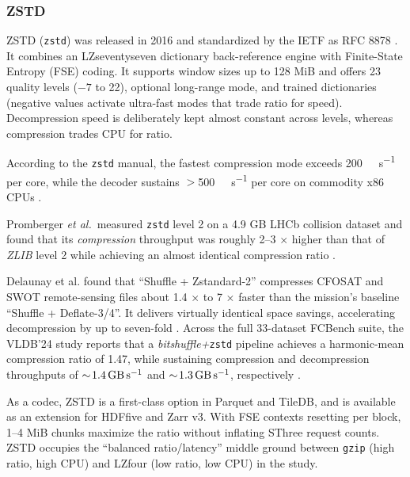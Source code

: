 \documentclass[nomenclature, english, bibtex]{kththesis}
\numberwithin{listing}{chapter}
\begin{document}
\subsubsection{\texorpdfstring{\gls{ZSTD}}{zstd}}
\label{sec:compression-zstd}
\gls{ZSTD} (\texttt{zstd}) was released in 2016 and standardized by the IETF as \gls{RFC} 8878 \cite{collet2021rfc8878}. It combines an \gls{LZseventyseven} dictionary back-reference engine with Finite-State Entropy (\gls{FSE}) coding. It supports window sizes up to 128 MiB and offers 23 quality levels ($-7$ to 22), optional long-range mode, and trained dictionaries (negative values activate ultra-fast modes that trade ratio for speed). Decompression speed is deliberately kept almost constant across levels, whereas compression trades \gls{CPU} for ratio.

According to the \texttt{zstd} manual, the fastest compression mode exceeds \SI{200}{\mega\byte\per\second} per core, while the decoder sustains $>$\SI{500}{\mega\byte\per\second} per core on commodity x86 \gls{CPU}s \cite{zstdman2025}.

Promberger \emph{et al.}\ measured \texttt{zstd} level 2 on a 4.9 GB \gls{LHCb} collision dataset and found that its \emph{compression} throughput was roughly 2–3 \(\times\) higher than that of \emph{\gls{ZLIB}} level 2 while achieving an almost identical compression ratio \cite{promberger2023characterization}.

Delaunay et al. found that “Shuffle + Zstandard-2” compresses \gls{CFOSAT} and \gls{SWOT} remote-sensing files about 1.4 \(\times\) to 7 \(\times\) faster than the mission’s baseline “Shuffle + Deflate-3/4”. It delivers virtually identical space savings, accelerating decompression by up to seven-fold \cite{delaunay2019evaluation}. Across the full 33-dataset \gls{FCBench} suite, the \gls{VLDB}’24 study reports that a \emph{bitshuffle+}\texttt{zstd} pipeline achieves a harmonic-mean compression ratio of 1.47, while sustaining compression and decompression throughputs of $\sim\!\SI{1.4}{\giga\byte\per\second}$ and $\sim\!\SI{1.3}{\giga\byte\per\second}$, respectively  \cite{chen2023fcbench}.

As a codec, \gls{ZSTD} is a first-class option in Parquet and TileDB, and is available as an extension for \gls{HDFfive} and Zarr v3. With \gls{FSE} contexts resetting per block, 1–4 MiB chunks maximize the ratio without inflating \gls{SThree} request counts. \gls{ZSTD} occupies the “balanced ratio/latency” middle ground between \texttt{gzip} (high ratio, high \gls{CPU}) and \gls{LZfour} (low ratio, low \gls{CPU}) in the study.
\end{document}
